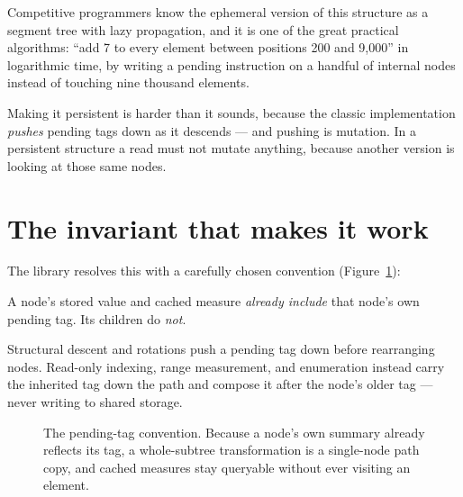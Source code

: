 \documentclass[11pt,twoside,openright]{book}
\begin{document}
\noindent
Competitive programmers know the ephemeral version of this structure as a
segment tree with lazy propagation, and it is one of the great practical
algorithms: ``add 7 to every element between positions 200 and 9{,}000'' in
logarithmic time, by writing a pending instruction on a handful of internal
nodes instead of touching nine thousand elements.

Making it persistent is harder than it sounds, because the classic
implementation \emph{pushes} pending tags down as it descends --- and pushing is
mutation. In a persistent structure a read must not mutate anything, because
another version is looking at those same nodes.

\section{The invariant that makes it work}

The library resolves this with a carefully chosen convention
(Figure~\ref{fig:rangetag}):

\begin{contractbox}
A node's stored value and cached measure \emph{already include} that node's own
pending tag. Its children do \emph{not}.

Structural descent and rotations push a pending tag down before rearranging
nodes. Read-only indexing, range measurement, and enumeration instead carry the
inherited tag down the path and compose it after the node's older tag --- never
writing to shared storage.
\end{contractbox}

\begin{figure}[htbp]
\centering
{}
\caption{The pending-tag convention. Because a node's own summary already
reflects its tag, a whole-subtree transformation is a single-node path copy, and
cached measures stay queryable without ever visiting an element.}
\label{fig:rangetag}
\end{figure}
\end{document}
